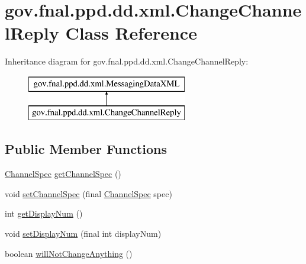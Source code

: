 \hypertarget{classgov_1_1fnal_1_1ppd_1_1dd_1_1xml_1_1ChangeChannelReply}{\section{gov.\-fnal.\-ppd.\-dd.\-xml.\-Change\-Channel\-Reply Class Reference}
\label{classgov_1_1fnal_1_1ppd_1_1dd_1_1xml_1_1ChangeChannelReply}
}
Inheritance diagram for gov.\-fnal.\-ppd.\-dd.\-xml.\-Change\-Channel\-Reply\-:\begin{figure}[H]
\begin{center}
\leavevmode
\includegraphics[height=2.000000cm]{classgov_1_1fnal_1_1ppd_1_1dd_1_1xml_1_1ChangeChannelReply}
\end{center}
\end{figure}
\subsection*{Public Member Functions}
\begin{DoxyCompactItemize}
\item 
\hyperlink{classgov_1_1fnal_1_1ppd_1_1dd_1_1xml_1_1ChannelSpec}{Channel\-Spec} \hyperlink{classgov_1_1fnal_1_1ppd_1_1dd_1_1xml_1_1ChangeChannelReply_a049f748916247f6232c4902a08d87a76}{get\-Channel\-Spec} ()
\item 
void \hyperlink{classgov_1_1fnal_1_1ppd_1_1dd_1_1xml_1_1ChangeChannelReply_a626e5e672e2191972a2a785095b46839}{set\-Channel\-Spec} (final \hyperlink{classgov_1_1fnal_1_1ppd_1_1dd_1_1xml_1_1ChannelSpec}{Channel\-Spec} spec)
\item 
int \hyperlink{classgov_1_1fnal_1_1ppd_1_1dd_1_1xml_1_1ChangeChannelReply_a48ed784b7031bac3d8d42fd90ac7a4b0}{get\-Display\-Num} ()
\item 
void \hyperlink{classgov_1_1fnal_1_1ppd_1_1dd_1_1xml_1_1ChangeChannelReply_a77ff274b50af1b3df5ec003208dc2b4c}{set\-Display\-Num} (final int display\-Num)
\item 
boolean \hyperlink{classgov_1_1fnal_1_1ppd_1_1dd_1_1xml_1_1ChangeChannelReply_a4911bb86f78e6665f2637a8c89b4693e}{will\-Not\-Change\-Anything} ()
\end{DoxyCompactItemize}


